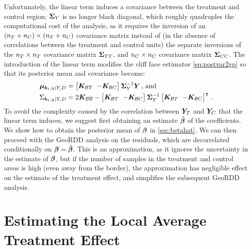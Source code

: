 Unfortunately, the linear term induces a covariance between the treatment and control region; \(\bm{\Sigma}_Y\) is no longer black diagonal, which roughly quadruples the computational cost of the analysis, as it requires the inversion of an \((n_T{}+n_C{}) \times (n_T{}+n_C{})\) covariance matrix instead of (in the absence of correlations between the treatment and control units) the separate inversions of the \(n_T{} \times n_T{}\) covariance matrix \(\bm{\Sigma}_{T T}\), and \(n_C{} \times n_C{}\) covariance matrix \(\bm{\Sigma}_{C C}\).
The introduction of the linear term modifies the cliff face estimator \autoref{eq:postvar2gp} so that its posterior mean and covariance become:
\begin{equation}
    \begin{split}
        \muvec_{\sentinels \mid Y, D} &= 
        \begingroup\SmallColSep
        \begin{bmatrix}
            \KBT & -\KBC
        \end{bmatrix}
        \SigmaMat_Y^{-1}
        \Yvec
        \endgroup
        \,\text{, and}\\
        \Sigma_{\sentinels \mid Y, D} &=
        \begingroup\SmallColSep
        2 \KBB -
        \begin{bmatrix}
            \KBT & -\KBC
        \end{bmatrix}
        \SigmaMat_Y^{-1}
        \begin{bmatrix}
            \KBT & -\KBC
        \end{bmatrix}\trans
        \endgroup
        \,.
    \end{split}
    \label{eq:cliff_with_covariates}
\end{equation}
To avoid the complexity caused by the correlation between \(\bm{Y}_{T}\) and \(\bm{Y}_{C}\) that the linear term induces, we suggest first obtaining an estimate \(\hat{\bm{\beta}}\) of the coefficients.
We show how to obtain the posterior mean of \(\bm{\beta}\) in \autoref{sec:betahat}.
We can then proceed with the GeoRDD analysis on the residuals, which are decorrelated conditionally on \(\bm{\beta}=\hat{\bm{\beta}}\).
This is an approximation, as it ignores the uncertainty in the estimate of \(\bm{\beta}\), but if the number of samples in the treatment and control areas is high (even away from the border), the approximation has negligible effect on the estimate of the treatment effect, and simplifies the subsequent GeoRDD analysis.

\section{Estimating the Local Average Treatment Effect}
\label{sec:ate}

